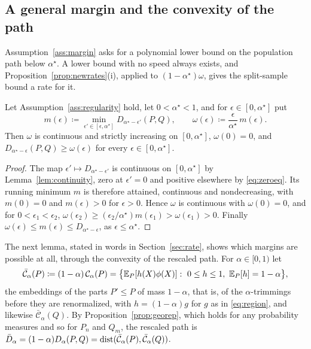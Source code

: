 \subsection{A general margin and the convexity of the path}
\label{sec:generalmargin}

Assumption~\ref{ass:margin} asks for a polynomial lower bound on the population path below $\alpha^\star$. A lower
bound with no speed always exists, and Proposition~\ref{prop:newrates}(i), applied to $(1-\alpha^\star)\omega$, gives
the split-sample bound a rate for it.

\begin{lemma}
\label{lem:marginexists}
Let Assumption~\ref{ass:regularity} hold, let $0<\alpha^\star<1$, and for $\epsilon\in[0,\alpha^\star]$ put
\[
m(\epsilon)\coloneqq\min_{\epsilon'\in[\epsilon,\alpha^\star]}D_{\alpha^\star-\epsilon'}(P,Q),
\qquad
\omega(\epsilon)\coloneqq\frac{\epsilon}{\alpha^\star}\,m(\epsilon).
\]
Then $\omega$ is continuous and strictly increasing on $[0,\alpha^\star]$, $\omega(0)=0$, and
$D_{\alpha^\star-\epsilon}(P,Q)\ge\omega(\epsilon)$ for every $\epsilon\in[0,\alpha^\star]$.
\end{lemma}

\begin{proof}
The map $\epsilon'\mapsto D_{\alpha^\star-\epsilon'}$ is continuous on $[0,\alpha^\star]$ by Lemma~\ref{lem:continuity},
zero at $\epsilon'=0$ and positive elsewhere by \eqref{eq:zeroeq}. Its running minimum $m$ is therefore attained,
continuous and nondecreasing, with $m(0)=0$ and $m(\epsilon)>0$ for $\epsilon>0$. Hence $\omega$ is continuous with
$\omega(0)=0$, and for $0<\epsilon_1<\epsilon_2$, $\omega(\epsilon_2)\ge(\epsilon_2/\alpha^\star)m(\epsilon_1)>\omega(\epsilon_1)>0$.
Finally $\omega(\epsilon)\le m(\epsilon)\le D_{\alpha^\star-\epsilon}$, as $\epsilon\le\alpha^\star$.
\end{proof}

The next lemma, stated in words in Section~\ref{sec:rate}, shows which margins are possible at all, through the
convexity of the rescaled path. For $\alpha\in[0,1)$ let
\[
\bar{\mathcal C}_\alpha(P)\coloneqq(1-\alpha)\,\mathcal C_\alpha(P)=\big\{\E_P[h(X)\phi(X)]:\ 0\le h\le1,\ \E_P[h]=1-\alpha\big\},
\]
the embeddings of the parts $P'\le P$ of mass $1-\alpha$, that is, of the $\alpha$-trimmings before they are
renormalized, with $h=(1-\alpha)g$ for $g$ as in \eqref{eq:region}, and likewise $\bar{\mathcal C}_\alpha(Q)$. By
Proposition~\ref{prop:georep}, which holds for any probability measures and so for $P_n$ and $Q_m$, the rescaled path
is $\bar D_\alpha=(1-\alpha)D_\alpha(P,Q)=\operatorname{dist}(\bar{\mathcal C}_\alpha(P),\bar{\mathcal C}_\alpha(Q))$.

